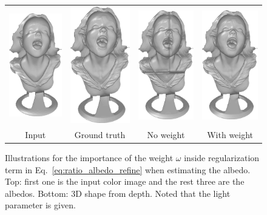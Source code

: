\begin{figure}[!ht]
{\begin{tabular}{c|c c c}
   \includegraphics[height = 0.32\linewidth]{figures/methodology/ratio_syn_shapeInput.pdf} \hspace{0.1em}
   &\hspace{0.1em}
   \includegraphics[height = 0.32\linewidth]{figures/methodology/ratio_syn_shapeGT.pdf} &
   \includegraphics[height = 0.32\linewidth]{figures/methodology/ratio_syn_shapeNR.pdf} &
   \includegraphics[height = 0.32\linewidth]{figures/methodology/ratio_syn_shapeR.pdf} \\
   {Input} & {Ground truth} & {No weight} &{With weight}                 
 \end{tabular}}
\caption{Illustrations for the importance of the weight $\omega$ inside regularization term in Eq.~\ref{eq:ratio_albedo_refine} when estimating the albedo. Top: first one is the input color image and the rest three are the albedos. Bottom: 3D shape from depth. Noted that the light parameter is given.}
\label{fig:ratio_albedo_demo}
\end{figure}


